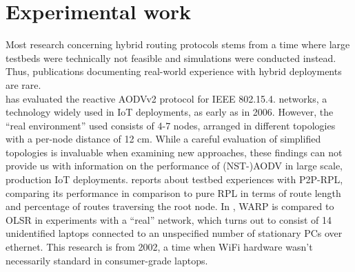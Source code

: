 \documentclass[a4paper,10pt]{scrartcl}
\begin{document}

\section{Experimental work}
\label{sec:experiments}
Most research concerning hybrid routing protocols stems from a time where large testbeds were technically not feasible and simulations were conducted instead. 
Thus, publications documenting real-world experience with hybrid deployments are rare.\\

\cite{gomez_NSTAODV_eval} has evaluated the reactive AODVv2 protocol for IEEE 802.15.4. networks, a technology widely used in IoT deployments, as early as in 2006. However, the ``real environment'' used consists of 4-7 nodes, arranged in different topologies with a per-node distance of 12 cm. While a careful evaluation of simplified topologies is invaluable when examining new approaches, these findings can not provide us with information on the performance of (NST-)AODV in large scale, production IoT deployments.
\cite{baccelli_p2p_rpl} reports about testbed experiences with P2P-RPL, comparing its performance in comparison to pure RPL in terms of route length and percentage of routes traversing the root node.
In \cite{WARP}, WARP is compared to OLSR in experiments with a ``real'' network, which turns out to consist of 14 unidentified laptops connected to an unspecified number of stationary PCs over ethernet. This research is from 2002, a time when WiFi hardware wasn't necessarily standard in consumer-grade laptops.\\
\end{document}
